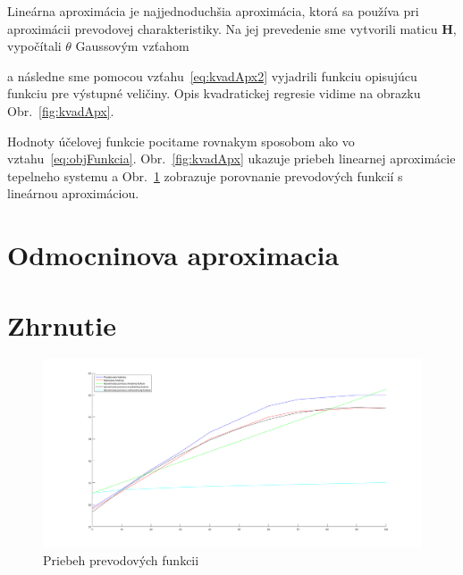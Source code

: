 \documentclass{article}
\begin{document}
Lineárna aproximácia je najjednoduchšia aproximácia, ktorá sa používa pri aproximácii prevodovej
charakteristiky. Na jej prevedenie sme vytvorili maticu \textbf{H}, vypočítali
\(\theta\) Gaussovým vzťahom

a následne sme pomocou vzťahu~\ref{eq:kvadApx2} vyjadrili funkciu opisujúcu funkciu pre výstupné
veličiny. Opis kvadratickej regresie vidime na obrazku Obr.~\ref{fig:kvadApx}.

Hodnoty účelovej funkcie pocitame rovnakym sposobom ako vo vztahu~\ref{eq:objFunkcia}.
Obr.~\ref{fig:kvadApx} ukazuje priebeh linearnej aproximácie tepelneho systemu a
Obr.~\ref{fig:prevod} zobrazuje porovnanie prevodových funkcií s lineárnou aproximáciou.

\clearpage

\section{Odmocninova aproximacia}
\label{sec:odm}

\clearpage



\section{Zhrnutie}
\label{sec:zhrnutie}

\begin{figure}[!htbp]
	\begin{center}
		\includegraphics[width=\textwidth]{./include/prevodove_funkcie.png}
		\caption{Priebeh prevodových funkcii}
		\label{fig:prevod}
	\end{center}
	\hfill
\end{figure}
\end{document}
